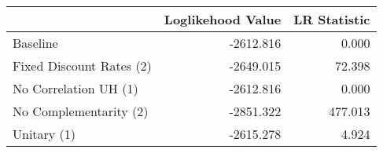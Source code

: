 \begin{tabular}{lrr}
\toprule
{} & Loglikehood Value & LR Statistic \\
\midrule
Baseline                 &         -2612.816 &        0.000 \\
Fixed Discount Rates (2) &         -2649.015 &       72.398 \\
No Correlation UH (1)    &         -2612.816 &        0.000 \\
No Complementarity (2)   &         -2851.322 &      477.013 \\
Unitary (1)              &         -2615.278 &        4.924 \\
\bottomrule
\end{tabular}
